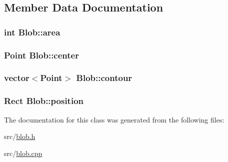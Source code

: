 \subsection{Member Data Documentation}
\hypertarget{class_blob_ab4518ab5ca61c304ea4bc2cdb9caa32f}{
\subsubsection[{area}]{\setlength{\rightskip}{0pt plus 5cm}int {\bf Blob::area}}}
\label{class_blob_ab4518ab5ca61c304ea4bc2cdb9caa32f}
\hypertarget{class_blob_a55f346db1ac5b462f4f21837fa684131}{
\subsubsection[{center}]{\setlength{\rightskip}{0pt plus 5cm}Point {\bf Blob::center}}}
\label{class_blob_a55f346db1ac5b462f4f21837fa684131}
\hypertarget{class_blob_a605d60a2ed8812901ede80e75822ce34}{
\subsubsection[{contour}]{\setlength{\rightskip}{0pt plus 5cm}vector$<$Point$>$ {\bf Blob::contour}}}
\label{class_blob_a605d60a2ed8812901ede80e75822ce34}
\hypertarget{class_blob_a3b0e9ce257ffc2df3d7ba41a863c2c10}{
\subsubsection[{position}]{\setlength{\rightskip}{0pt plus 5cm}Rect {\bf Blob::position}}}
\label{class_blob_a3b0e9ce257ffc2df3d7ba41a863c2c10}


The documentation for this class was generated from the following files:\begin{DoxyCompactItemize}
\item 
src/\hyperlink{blob_8h}{blob.h}\item 
src/\hyperlink{blob_8cpp}{blob.cpp}\end{DoxyCompactItemize}
